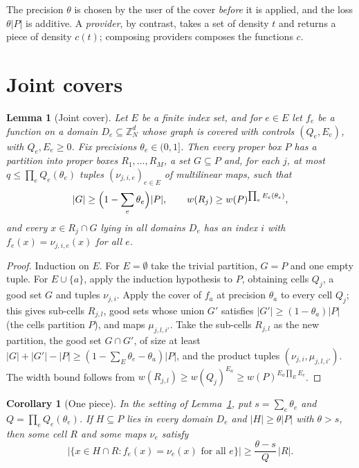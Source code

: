 \documentclass[11pt]{article}
\newtheorem{lemma}[theorem]{Lemma}
\newtheorem{corollary}[theorem]{Corollary}
\theoremstyle{definition}
\theoremstyle{remark}
\newcommand{\Qb}{Q}
\newcommand{\Eb}{E}
\begin{document}
The precision $\theta$ is chosen by the user of the cover \emph{before} it is
applied, and the loss $\theta|P|$ is additive. A \emph{provider}, by contrast,
takes a set of density $t$ and returns a piece of density $c(t)$; composing
providers composes the functions $c$.

\section{Joint covers}

\begin{lemma}[Joint cover]\label{lem:joint}
Let $E$ be a finite index set, and for $e\in E$ let $f_e$ be a function on a
domain $D_e\subseteq\mathbb{Z}_N^d$ whose graph is covered with controls
$(\Qb_e,\Eb_e)$, with $\Qb_e,\Eb_e\ge0$. Fix precisions $\theta_e\in(0,1]$.
Then every proper box $P$ has a partition into proper boxes $R_1,\dots,R_M$, a
set $G\subseteq P$ and, for each $j$, at most $q\le\prod_e\Qb_e(\theta_e)$
tuples $(\nu_{j,i,e})_{e\in E}$ of multilinear maps, such that
\[
  |G|\ge\Bigl(1-\sum_{e}\theta_e\Bigr)|P|,\qquad
  w(R_j)\ge w(P)^{\prod_e\Eb_e(\theta_e)},
\]
and every $x\in R_j\cap G$ lying in all domains $D_e$ has an index $i$ with
$f_e(x)=\nu_{j,i,e}(x)$ for all $e$.
\end{lemma}

\begin{proof}
Induction on $E$. For $E=\emptyset$ take the trivial partition, $G=P$ and one
empty tuple. For $E\cup\{a\}$, apply the induction hypothesis to $P$, obtaining
cells $Q_j$, a good set $G$ and tuples $\nu_{j,i}$. Apply the cover of $f_a$ at
precision $\theta_a$ to every cell $Q_j$; this gives sub-cells $R_{j,l}$, good
sets whose union $G'$ satisfies $|G'|\ge(1-\theta_a)|P|$ (the cells partition
$P$), and maps $\mu_{j,l,i'}$. Take the sub-cells $R_{j,l}$ as the new
partition, the good set $G\cap G'$, of size at least
$|G|+|G'|-|P|\ge(1-\sum_E\theta_e-\theta_a)|P|$, and the product tuples
$(\nu_{j,i},\mu_{j,l,i'})$. The width bound follows from
$w(R_{j,l})\ge w(Q_j)^{\Eb_a}\ge w(P)^{\Eb_a\prod_E\Eb_e}$.
\end{proof}

\begin{corollary}[One piece]\label{cor:piece}
In the setting of Lemma~\ref{lem:joint}, put $s=\sum_e\theta_e$ and
$Q=\prod_e\Qb_e(\theta_e)$. If $H\subseteq P$ lies in every domain $D_e$ and
$|H|\ge\theta|P|$ with $\theta>s$, then some cell $R$ and some maps $\nu_e$
satisfy
\[
  \bigl|\{x\in H\cap R: f_e(x)=\nu_e(x)\text{ for all }e\}\bigr|
  \ge\frac{\theta-s}{Q}\,|R| .
\]
\end{corollary}
\end{document}
